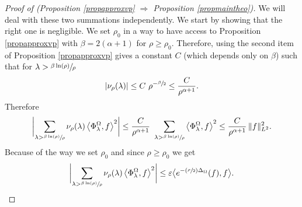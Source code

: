 \documentclass[JEP,XML,SOM,Unicode,NoFloatCountersInSection,published]{cedram}
\let\epsilon\varepsilon
\newcommand{\Psfrac}[2]{(\sfrac{#1}{#2})}
\theoremstyle{plain}
\theoremstyle{definition}
\newcommand{\somme}[1]{\sum_{#1}}
\begin{document}
\begin{proof}[Proof of (Proposition \ref{propapproxvp}
$\Rightarrow$ Proposition \ref{propmaintheo})]
We will deal with these two summations independently. We start by showing that the right one is negligible. We set $\rho_0$ in a way to have access to Proposition \ref{propapproxvp} with $\beta = 2 (\alpha +1)$ for $\rho \ge \rho_0$. Therefore, using the second item of Proposition \ref{propapproxvp} gives a constant $C$ (which depends only on $\beta$) such that for $\lambda > \sfrac{\beta \ln(\rho)}{\rho}$
\begin{align*}
| \nu_{\rho} (\lambda) | \le C \ \rho^{-\sfrac{\beta}{2}} \le \frac{C}{\rho^{\alpha +1}}.
\end{align*}
Therefore
\[
\biggl| \somme{ \lambda > \sfrac{\beta \ln (\rho)} {\rho}} \nu_{\rho}(\lambda) \left<\Phi^{\Omega}_{\lambda},f \right>^2 \biggr| \le \frac{ C}{\rho^{\alpha+1}} \ \somme{ \lambda > \sfrac{\beta \ln (\rho)} {\rho}} \left<\Phi^{\Omega}_{\lambda},f \right>^2 \le \frac{C}{\rho^{\alpha+1}} \,\|f\|_{L^2}^2.
\]
Because of the way we set $\rho_0$ and since $\rho \ge \rho_0$ we get
\begin{equation}
\label{eq20}
\biggl| \somme{ \lambda > \sfrac{\beta \ln (\rho)} {\rho}} \nu_{\rho}(\lambda) \left<\Phi^{\Omega}_{\lambda},f \right>^2 \biggr| \le \epsilon \bigl< e^{- \Psfrac{\rho}{2} \Delta_{\Omega}}(f), f \bigr>.
\end{equation}


\end{proof}
\end{document}
